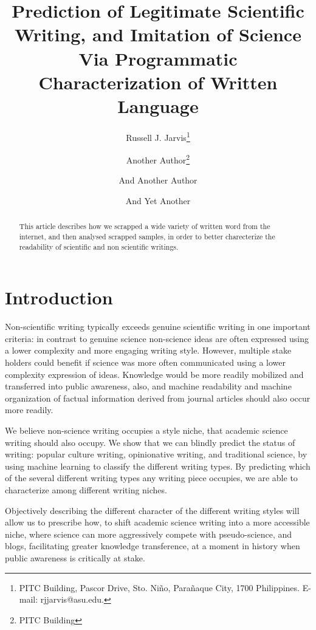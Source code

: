 \documentclass{clv3}
\begin{document}
\title{Prediction of Legitimate Scientific Writing, and Imitation of Science Via Programmatic Characterization of Written Language}

\author{Russell J. Jarvis\thanks{PITC Building, Pascor Drive, Sto. Ni\~no, Para\~naque City, 1700 Philippines. E-mail: rjjarvis@asu.edu.}}

\author{Another Author\thanks{PITC Building}}

\author{And Another Author}

\author{And Yet Another}

\maketitle

\begin{abstract}
This article describes how we scrapped a wide variety of written word from the internet, and then analysed scrapped samples, in order to better charecterize the readability of scientific and non scientific writings.
\end{abstract}

\section{Introduction}

Non-scientific writing typically exceeds genuine scientific writing in one important criteria: in contrast to genuine science non-science ideas are often expressed using a lower complexity and more engaging writing style.  However, multiple stake holders could benefit if science was more often communicated using a lower complexity expression of ideas. Knowledge would be more readily mobilized and transferred into public awareness, also, and machine readability and machine organization of factual information derived from journal articles should also occur more readily.

We believe non-science writing occupies a style niche, that academic science writing should also occupy. We show that we can blindly predict the status of writing: popular culture writing, opinionative writing, and traditional science, by using machine learning to classify the different writing types. By predicting which of the several different writing types any writing piece occupies, we are able to characterize among different writing niches.

Objectively describing the different character of the different writing styles will allow us to prescribe how, to shift academic science writing into a more accessible niche, where science can more aggressively compete with pseudo-science, and blogs, facilitating greater knowledge transference, at a moment in history when public awareness is critically at stake.
\end{document}
